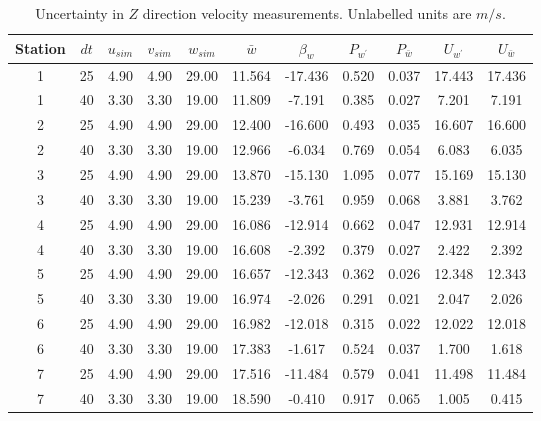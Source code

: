 \begin{table}[H]
\begin{center}
\begin{tabular}{|ccccccccccc|}
	\hline
	Station & $dt$ & $u_{sim}$ & $v_{sim}$ & $w_{sim}$ & $\bar{w}$ & $\beta_w$ & $P_{w^{\prime}}$ & $P_{\bar{w}}$ & $U_{w^{\prime}}$ & $U_{\bar{w}}$\\
	\hline
	1 & 25 & 4.90 & 4.90 & 29.00 & 11.564 & -17.436 & 0.520 & 0.037 & 17.443 & 17.436\\
	1 & 40 & 3.30 & 3.30 & 19.00 & 11.809 & -7.191 & 0.385 & 0.027 & 7.201 & 7.191\\
	2 & 25 & 4.90 & 4.90 & 29.00 & 12.400 & -16.600 & 0.493 & 0.035 & 16.607 & 16.600\\
	2 & 40 & 3.30 & 3.30 & 19.00 & 12.966 & -6.034 & 0.769 & 0.054 & 6.083 & 6.035\\
	3 & 25 & 4.90 & 4.90 & 29.00 & 13.870 & -15.130 & 1.095 & 0.077 & 15.169 & 15.130\\
	3 & 40 & 3.30 & 3.30 & 19.00 & 15.239 & -3.761 & 0.959 & 0.068 & 3.881 & 3.762\\
	4 & 25 & 4.90 & 4.90 & 29.00 & 16.086 & -12.914 & 0.662 & 0.047 & 12.931 & 12.914\\
	4 & 40 & 3.30 & 3.30 & 19.00 & 16.608 & -2.392 & 0.379 & 0.027 & 2.422 & 2.392\\
	5 & 25 & 4.90 & 4.90 & 29.00 & 16.657 & -12.343 & 0.362 & 0.026 & 12.348 & 12.343\\
	5 & 40 & 3.30 & 3.30 & 19.00 & 16.974 & -2.026 & 0.291 & 0.021 & 2.047 & 2.026\\
	6 & 25 & 4.90 & 4.90 & 29.00 & 16.982 & -12.018 & 0.315 & 0.022 & 12.022 & 12.018\\
	6 & 40 & 3.30 & 3.30 & 19.00 & 17.383 & -1.617 & 0.524 & 0.037 & 1.700 & 1.618\\
	7 & 25 & 4.90 & 4.90 & 29.00 & 17.516 & -11.484 & 0.579 & 0.041 & 11.498 & 11.484\\
	7 & 40 & 3.30 & 3.30 & 19.00 & 18.590 & -0.410 & 0.917 & 0.065 & 1.005 & 0.415\\
	\hline
\end{tabular}
\caption{Uncertainty in $Z$ direction velocity measurements. Unlabelled units are $m/s$.}
\label{table:uncertainties_w}
\end{center}
\end{table}
